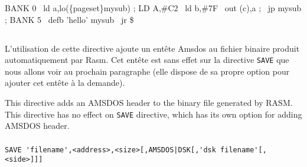 \begin{code}
BANK 0
\  ld a,lo(\{pageset\}mysub) ; LD A,\#C2
\  ld b,\#7F
\  out (c),a           ; 
\  jp mysub            ; 
\medskip
BANK 5
\  defb 'hello'
mysub
\  jr \$
\end{code}

\subsection{}

\subsubsection{}

\begin{xfr}
L'utilisation de cette directive ajoute un entête Amsdos au fichier binaire produit automatiquement par Rasm. Cet entête est sans effet sur la directive \texttt{SAVE} que nous allons voir au prochain paragraphe (elle dispose de sa propre option pour ajouter cet entête à la demande).
\end{xfr}

\begin{xen}
This directive adds an AMSDOS header to the binary file generated by RASM.
This directive has no effect on \texttt{SAVE} directive, which has its own option for adding AMSDOS header.
\end{xen}

\subsubsection{}

\begin{verbatim}
SAVE 'filename',<address>,<size>[,AMSDOS|DSK[,'dsk filename'[,<side>]]]
\end{verbatim}


